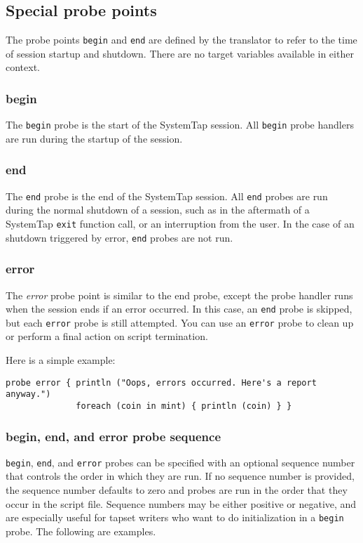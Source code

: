 \documentclass[twoside,english]{article}
\newenvironment{vindent}
{\begin{list}{}{\setlength{\listparindent}{6pt}}
\item[]}
{\end{list}}
\begin{document}
\subsection{Special probe points}

The probe points \texttt{begin} and \texttt{end} are defined by the translator
to refer to the time of session startup and shutdown. There are no target
variables available in either context.


\subsubsection{begin}
The \texttt{begin} probe is the start of the SystemTap session.
All \texttt{begin}
probe handlers are run during the startup of the session.


\subsubsection{end}
The \texttt{end} probe is the end of the SystemTap session. All \texttt{end}
probes are run during the normal shutdown of a session, such as in the aftermath
of a SystemTap \texttt{exit} function call, or an interruption from the user.
In the case of an shutdown triggered by error, \texttt{end} probes are not run.


\subsubsection{error}
The \emph{error} probe point is similar to the end
probe, except the probe handler runs when the session ends if an error
occurred.  In this case, an \texttt{end} probe is skipped, but each
\texttt{error} probe is still attempted.  You can use an
\texttt{error} probe to clean up or perform a final action on script
termination.

Here is a simple example:
\begin{vindent}
\begin{verbatim}
probe error { println ("Oops, errors occurred. Here's a report anyway.")
              foreach (coin in mint) { println (coin) } }
\end{verbatim}
\end{vindent}


\subsubsection{begin, end, and error probe sequence}
\texttt{begin}, \texttt{end}, and \texttt{error} probes can be
specified with an optional sequence number that controls the order in
which they are run. If no sequence number is provided, the sequence
number defaults to zero and probes are run in the order that they
occur in the script file. Sequence numbers may be either positive or
negative, and are especially useful for tapset writers who want to do
initialization in a \texttt{begin} probe. The following are examples.
\end{document}

